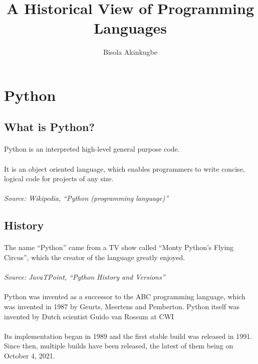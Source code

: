 \documentclass{article}
\begin{document}
	\title{A Historical View of Programming Languages}
	\author{Bisola Akinkugbe}
	\maketitle
	\section*{Python}
	\subsection*{What is Python?}
	\paragraph{}Python is an interpreted high-level general purpose code.
	\paragraph{} It is an object oriented language, which enables programmers to write concise, logical code for projects of any size.
	\paragraph{} \textit{Source: Wikipedia, “Python (programming language)”}
	\subsection*{History}
	\paragraph{}The name “Python” came from a TV show called “Monty Python’s Flying Circus”, which the creator of the language greatly enjoyed.
	\paragraph{}\textit{Source: JavaTPoint, “Python History and Versions”} \paragraph{}Python was invented as a successor to the ABC programming language, which was invented in 1987 by Geurts, Meertens and Pemberton.
	Python itself was invented by Dutch scientist Guido van Rossum at CWI 
	\paragraph{}Its implementation began in 1989 and the first stable build was released in 1991.
	Since then, multiple builds have been released, the latest of them being on October 4, 2021.
\end{document}
